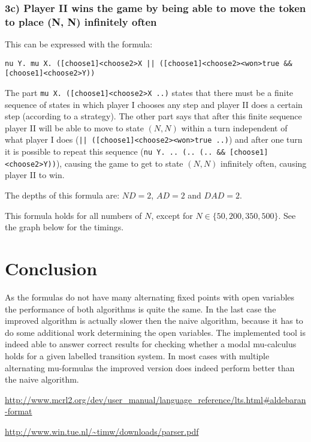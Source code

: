 \documentclass[10pt,a4paper]{article}
\begin{document}
\subsubsection{3c) Player II wins the game by being able to move the token to place (N, N) infinitely often}
This can be expressed with the formula:

\begin{center}
	{\tt nu Y. mu X. ([choose1]<choose2>X || ([choose1]<choose2><won>true \&\& [choose1]<choose2>Y))}
\end{center}

The part {\tt mu X. ([choose1]<choose2>X ..)} states that there must be a finite sequence of states in which player I chooses any step and player II does a certain step (according to a strategy). The other part says that after this finite sequence player II will be able to move to state $(N, N)$ within a turn independent of what player I does ({\tt || ([choose1]<choose2><won>true ..)}) and after one turn it is possible to repeat this sequence ({\tt nu Y. .. (.. (.. \&\& [choose1]<choose2>Y))}), causing the game to get to state $(N, N)$ infinitely often, causing player II to win.

The depths of this formula are: $ND = 2$, $AD = 2$ and $DAD = 2$.

This formula holds for all numbers of $N$, except for $N \in \{50, 200, 350, 500\}$. See the graph below for the timings.



\section{Conclusion}\label{conc}

As the formulas do not have many alternating fixed points with open variables the performance of both algorithms is quite the same. In the last case the improved algorithm is actually slower then the naive algorithm, because it has to do some additional work determining the open variables.
The implemented tool is indeed able to answer correct results for checking whether a modal mu-calculus holds for a given labelled transition system. In most cases with multiple alternating mu-formulas the improved version does indeed perform better than the naive algorithm.


\begin{thebibliography}{9}
	 \url{http://www.mcrl2.org/dev/user_manual/language_reference/lts.html#aldebaran-format}
	
	 \url{http://www.win.tue.nl/\~timw/downloads/parser.pdf}
\end{thebibliography}
\end{document}
